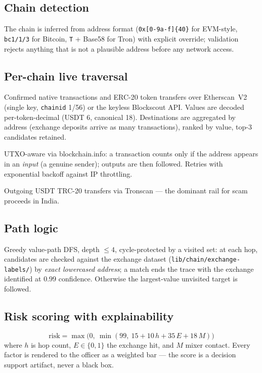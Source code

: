 \documentclass[11pt,a4paper]{article}
\begin{document}
\subsection{Chain detection}
The chain is inferred from address format (\texttt{0x[0-9a-f]\{40\}} for
EVM-style, \texttt{bc1/1/3} for Bitcoin, \texttt{T} + Base58 for Tron) with
explicit override; validation rejects anything that is not a plausible address
before any network access.

\subsection{Per-chain live traversal}
\begin{description}[itemsep=0.15em]
  \item[ETH/BSC] Confirmed native transactions and ERC-20 token transfers over
  Etherscan~V2 (single key, \texttt{chainid} 1/56) or the keyless Blockscout API.
  Values are decoded per-token-decimal (USDT 6, canonical 18). Destinations are
  aggregated by address (exchange deposits arrive as many transactions),
  ranked by value, top-3 candidates retained.
  \item[BTC] UTXO-aware via blockchain.info: a transaction counts only if the
  address appears in an \emph{input} (a genuine sender); outputs are then
  followed. Retries with exponential backoff against IP throttling.
  \item[TRON] Outgoing USDT TRC-20 transfers via Tronscan --- the dominant rail
  for scam proceeds in India.
\end{description}

\subsection{Path logic}
Greedy value-path DFS, depth $\le 4$, cycle-protected by a visited set:
at each hop, candidates are checked against the exchange dataset
(\texttt{lib/chain/exchange-labels/}) by \emph{exact lowercased address}; a match
ends the trace with the exchange identified at $0.99$ confidence. Otherwise the
largest-value unvisited target is followed.

\subsection{Risk scoring with explainability}
\begin{equation}
\mathrm{risk} = \max\bigl(0,\ \min(99,\ 15 + 10\,h + 35\,E + 18\,M)\bigr)
\end{equation}
where $h$ is hop count, $E \in \{0,1\}$ the exchange hit, and $M$ mixer contact.
Every factor is rendered to the officer as a weighted bar --- the score is a
decision support artifact, never a black box.
\end{document}
